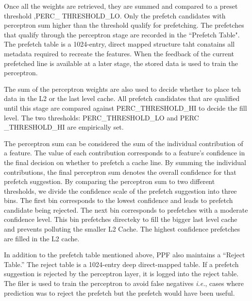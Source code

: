 Once all the weights are retrieved, they are summed and compared to a preset threshold 
,PERC\_ THRESHOLD\_LO.  Only the prefetch candidates with perceptron sum higher than 
the threshold qualify for prefetching.  The prefetches that qualify through the perceptron 
stage are recorded in the ``Prefetch Table". The prefetch table is a 1024-entry, direct mapped structure taht
conatains all metadata required to recreate the features. 	%
When the feedback of the current prefetched line is available at a later stage, the
stored data is used to train the perceptron.

The sum of the perceptron weights are also used to decide whether to place teh 
data in the L2 or the last level cache. All prefetch candidates that are qualified until
this stage are compared against PERC\_THRESHOLD\_HI to decide the fill
level. The two thresholds: PERC\_THRESHOLD\_LO and PERC \_THRESHOLD\_HI are
empirically set.

The perceptron sum can be considered the sum of the individual contribution
of a feature.  The value of each contribution corresponds to a feature's
confidence in the final decision on whether to prefetch a cache line. By summing the
individual contributions, the final perceptron sum denotes the overall
confidence for that prefetch suggestion.  By comparing the perceptron sum
to two different thresholds, we divide the confidence scale of the
prefetch suggestion into three bins. The first bin corresponds to the lowest
confidence and leads to prefetch candidate being rejected.  The next bin
corresponds to prefetches with a moderate confidence level.  This bin prefetches
 directeky to fill the bigger last level cache and prevents polluting
the smaller L2 Cache.  The highest confidence prefetches are filled in the
L2 cache.

In addition to the prefetch table mentioned above, PPF also maintains a
``Reject Table.''  The reject table is a 1024-entry deep direct-mapped
table.  If a prefetch suggestion is rejected by the perceptron layer, it is
logged into the reject table.  The filer is used to train the perceptron to %
avoid false negatives \textit{i.e.}, cases where prediction was to reject the
prefetch but the prefetch would have been useful.



